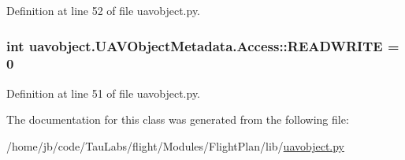 \-Definition at line 52 of file uavobject.\-py.

\hypertarget{classuavobject_1_1_u_a_v_object_metadata_1_1_access_ad34b855419d508cfdbeb7a63feda9d23}{
\subsubsection[{\-R\-E\-A\-D\-W\-R\-I\-T\-E}]{\setlength{\rightskip}{0pt plus 5cm}int {\bf uavobject.\-U\-A\-V\-Object\-Metadata.\-Access\-::\-R\-E\-A\-D\-W\-R\-I\-T\-E} = 0}}\label{classuavobject_1_1_u_a_v_object_metadata_1_1_access_ad34b855419d508cfdbeb7a63feda9d23}


\-Definition at line 51 of file uavobject.\-py.



\-The documentation for this class was generated from the following file\-:\begin{DoxyCompactItemize}
\item 
/home/jb/code/\-Tau\-Labs/flight/\-Modules/\-Flight\-Plan/lib/\hyperlink{uavobject_8py}{uavobject.\-py}\end{DoxyCompactItemize}
